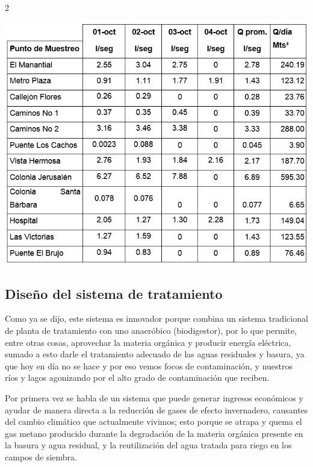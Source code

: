 \documentclass[11pt,spanish,Letterpaper,openany]{book}
\begin{document}
\begin {multicols}{2}
\begin {flushleft}
\begin{minipage}[c]{\columnwidth}
\includegraphics[width=1\linewidth]{images/201901-gfong-imagen04}

\end{minipage}

\end {flushleft}

\hypertarget{diseno-del-sistema-de-tratamiento}{%
\subsection{Diseño del sistema de tratamiento}\label{diseno-del-sistema-de-tratamiento}}

Como ya se dijo, este sistema es innovador porque combina un sistema tradicional de planta de tratamiento con uno anaeróbico (biodigestor), por lo que permite, entre otras cosas, aprovechar la materia orgánica y producir energía eléctrica, sumado a esto darle el tratamiento adecuado de las aguas residuales y basura, ya que hoy en día no se hace y por eso vemos focos de contaminación, y nuestros ríos y lagos agonizando por el alto grado de contaminación que reciben.

Por primera vez se habla de un sistema que puede generar ingresos económicos y ayudar de manera directa a la reducción de gases de efecto invernadero, causantes del cambio climático que actualmente vivimos; esto porque se atrapa y quema el gas metano producido durante la degradación de la materia orgánica presente en la basura y agua residual, y la reutilización del agua tratada para riego en los campos de siembra.


\end{multicols}
\end{document}
